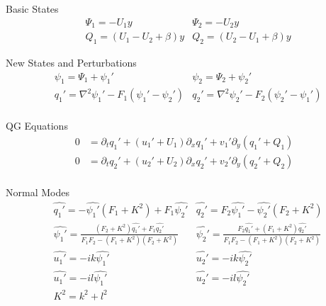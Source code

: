 \documentclass[12pt]{article}
\begin{document}
    \begin{subsection}{Basic States}
        \begin{align*}
            &\Psi_1 = -U_1 y                      &\Psi_2 = -U_2 y \\
            &Q_1 = (U_1 - U_2 + \beta) y   &Q_2 = (U_2 - U_1 + \beta) y
        \end{align*}
    \end{subsection}

    \begin{subsection}{New States and Perturbations}
        \begin{align*}
             &\psi_1 = \Psi_1 + \psi_1'
             &\psi_2 = \Psi_2 + \psi_2' \\
             &q_1' = \nabla^2\psi_1' - F_1(\psi_1' - \psi_2')
             &q_2' = \nabla^2\psi_2' - F_2(\psi_2' - \psi_1') \\
        \end{align*}
    \end{subsection}

    \begin{subsection}{QG Equations}
        \begin{align*}
             0 &= \partial_t q_1' + (u_1' + U_1)\partial_x q_1' + v_1' \partial_y(q_1' + Q_1) \\
             0 &= \partial_t q_2' + (u_2' + U_2)\partial_x q_2' + v_2' \partial_y(q_2' + Q_2) \\
        \end{align*}
    \end{subsection}

    \begin{subsection}{Normal Modes}
        \begin{align*}
             &\hat{q_1'} = -\hat{\psi_1'}(F_1 + K^2) + F_1\hat{\psi_2'}
             &\hat{q_2'} = F_2\hat{\psi_1'} - \hat{\psi_2'}(F_2 + K^2) \\
            &\hat{\psi_1'} = \frac{(F_2 + K^2) \hat{q_1'} + F_1\hat{q_2'}}{F_1F_2 - (F_1 + K^2)(F_2 + K^2)}
            &\hat{\psi_2'} = \frac{F_2\hat{q_1'} + (F_1 + K^2)\hat{q_2'}}{F_1F_2 - (F_1 + K^2)(F_2 + K^2)} \\
            &\hat{u_1'} = -ik \hat{\psi_1'}
            &\hat{u_2'} = -ik \hat{\psi_2'} \\
            &\hat{u_1'} = -il \hat{\psi_1'}
            &\hat{u_2'} = -il \hat{\psi_2'} \\
            &K^2 = k^2 + l^2
        \end{align*}
    \end{subsection}
\end{document}
